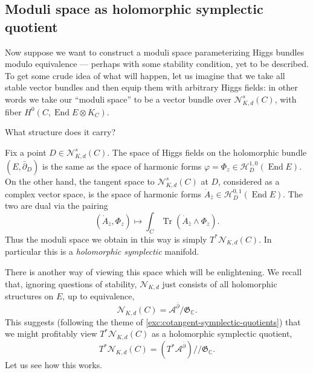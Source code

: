 \documentclass[12pt,letterpaper,reqno]{article}
\numberwithin{equation}{section}
\newcommand{\fG}{{\mathfrak G}}
\newcommand{\cN}{\ensuremath{\mathcal N}}
\newcommand{\cH}{\ensuremath{\mathcal H}}
\newcommand{\cA}{\ensuremath{\mathcal A}}
\newcommand{\C}{\ensuremath{\mathbb C}}
\newcommand{\kq}{/\!\!/}
\newcommand{\ti}[1]{\textit{#1}}
\DeclareMathOperator{\Tr}{Tr}
\DeclareMathOperator{\End}{End}
\newcommand{\insfig}[2]{

\medskip
\noindent
\begin{minipage}{\linewidth}

\makebox[\linewidth]{\texttt{[image: figures/\#1-crop.pdf]}}

\end{minipage}
\medskip

}
\begin{document}
\subsection{Moduli space as holomorphic symplectic quotient}

Now suppose we want to construct a moduli space parameterizing Higgs
bundles modulo equivalence --- perhaps with some stability condition,
yet to be described. To get some crude idea of what will happen,
let us imagine that we take all stable vector bundles
and then equip them with arbitrary Higgs fields: in other words
we take our ``moduli space'' to be a vector bundle over
$\cN^s_{K,d}(C)$, with fiber $H^0(C, \End E \otimes K_C)$.

\insfig{higgs-bundles-16}{1.0}

What structure does it carry?

Fix a point $D \in \cN^s_{K,d}(C)$.
The space of Higgs fields on the holomorphic bundle $(E, \bar\partial_D)$
is the same as the space of harmonic forms
$\varphi = \Phi_z \in \cH^{1,0}_D(\End E)$.
On the other hand, the tangent space to $\cN^s_{K,d}(C)$ at $D$, considered
as a complex vector space, is the space
of harmonic forms $\dot{A}_{\bar z} \in \cH^{0,1}_D(\End E)$.
The two are dual via the pairing
\begin{equation}
  (\dot{A}_{\bar z}, \Phi_z) \mapsto \int_C \Tr (\dot{A}_{\bar z} \wedge \Phi_z).
\end{equation}
Thus the moduli space we obtain in this way is simply $T^* \cN_{K,d}(C)$.
In particular this is a \ti{holomorphic symplectic} manifold.

There is another way of viewing this space which will be enlightening.
We recall that, ignoring questions of stability, $\cN_{K,d}$ just
consists of all holomorphic structures on $E$, up to equivalence,
\begin{equation}
	\cN_{K,d}(C) = \cA^{\bar\partial} / \fG_\C.
\end{equation}
This suggests
(following the theme of \autoref{exc:cotangent-symplectic-quotients}) that we might profitably view $T^* \cN_{K,d}(C)$
as a holomorphic symplectic quotient,
\begin{equation}
	T^* \cN_{K,d}(C) = (T^* \cA^{\bar\partial}) \kq \fG_\C.
\end{equation}
Let us see how this works.
\end{document}
